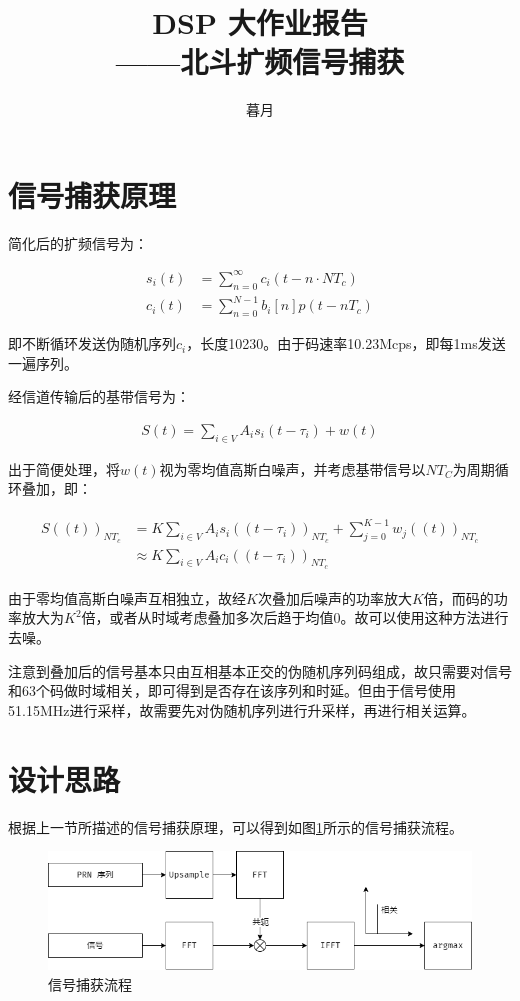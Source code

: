 \documentclass[a4paper, 10pt]{article}
\title{DSP 大作业报告\\——北斗扩频信号捕获}
\author{暮月}
\begin{document}
\maketitle

\section{信号捕获原理}

简化后的扩频信号为：

\begin{align}
    s_i(t) & = \sum_{n=0}^{\infty} c_i(t - n\cdot NT_c) \\
    c_i(t) & = \sum_{n=0}^{N-1} b_i[n]p(t-nT_c)
\end{align}

即不断循环发送伪随机序列$c_i$，长度10230。由于码速率10.23Mcps，即每1ms发送一遍序列。

经信道传输后的基带信号为：

\begin{align}
    S(t) = \sum_{i\in V} A_i s_i(t - \tau_i) + w(t)
\end{align}

出于简便处理，将$w(t)$视为零均值高斯白噪声，并考虑基带信号以$NT_C$为周期循环叠加，即：

\begin{align}
    \begin{split}
        S((t))_{NT_c} & = K \sum_{i\in V} A_i s_i((t - \tau_i))_{NT_c} + \sum_{j=0}^{K-1}w_j((t))_{NT_c}\\
        & \approx K \sum_{i\in V} A_i c_i((t - \tau_i))_{NT_c}
    \end{split}
\end{align}

由于零均值高斯白噪声互相独立，故经$K$次叠加后噪声的功率放大$K$倍，而码的功率放大为$K^2$倍，或者从时域考虑叠加多次后趋于均值0。故可以使用这种方法进行去噪。

注意到叠加后的信号基本只由互相基本正交的伪随机序列码组成，故只需要对信号和63个码做时域相关，即可得到是否存在该序列和时延。但由于信号使用51.15MHz进行采样，故需要先对伪随机序列进行升采样，再进行相关运算。

\section{设计思路}

根据上一节所描述的信号捕获原理，可以得到如图\ref{fig:system}所示的信号捕获流程。

\begin{figure}[ht]
    \centering
    \includegraphics[width=.8\textwidth]{../assets/system.png}
    \caption{信号捕获流程}
    \label{fig:system}
\end{figure}
\end{document}
